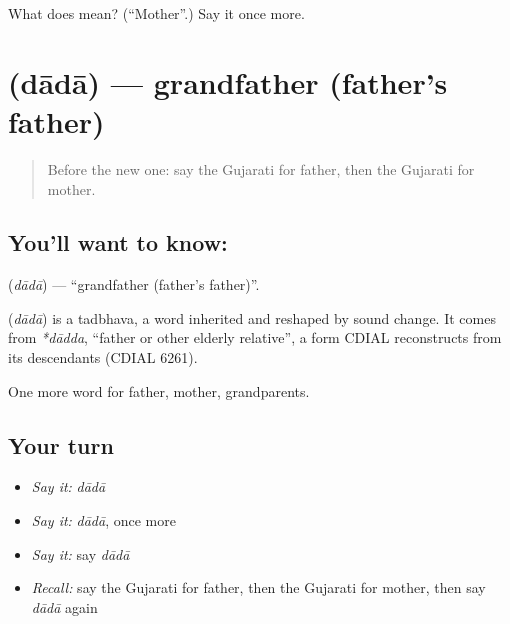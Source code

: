 \begin{tcolorbox}[breakable,colback=teal!4,colframe=teal!35!black,title={Before you move on}]
What does  mean? (\textquotedblleft{}Mother\textquotedblright{}.) Say it once more.
\end{tcolorbox}
\section[\texorpdfstring{\gu{દાદા} (dādā)}{દાદા (dādā)}]{ (dādā) — grandfather (father's father)}

\label{lesson:GU-C51-grandfather}



\begin{quote}
Before the new one: say the Gujarati for father, then the Gujarati for mother.
\end{quote}

\subsection*{You'll want to know: }
\textbf{} (\emph{dādā}) — \textquotedblleft{}grandfather (father's father)\textquotedblright{}.

\begin{cousinweb}
\textbf{} (\emph{dādā}) is a tadbhava, a word inherited and reshaped by sound change. It comes from \emph{*dādda}, \textquotedblleft{}father or other elderly relative\textquotedblright{}, a form CDIAL reconstructs from its descendants (CDIAL 6261).
\end{cousinweb}

\begin{grammarlens}[title={What you've built}]
One more word for father, mother, grandparents.
\end{grammarlens}

\subsection*{Your turn}
\begin{itemize}
\raggedright
  \item \emph{Say it:} \emph{dādā}
  \item \emph{Say it:} \emph{dādā}, once more
  \item \emph{Say it:} say \emph{dādā}
  \item \emph{Recall:} say the Gujarati for father, then the Gujarati for mother, then say \emph{dādā} again
\end{itemize}

